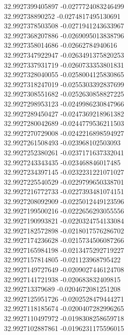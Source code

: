 {32.9927399405897	-0.0277724083246499\\
32.992738890252	-0.0274817495130691\\
32.9927378503508	-0.0271941243633967\\
32.9927368207886	-0.0269095013838796\\
32.9927358014686	-0.02662784940616\\
32.9927347922947	-0.0263491375820253\\
32.9927337931719	-0.0260733353801831\\
32.9927328040055	-0.0258004125830865\\
32.9927318247019	-0.0255303392837699\\
32.9927308551682	-0.0252630858827225\\
32.9927298953123	-0.0249986230847966\\
32.9927289450427	-0.0247369218961382\\
32.9927280042689	-0.0244779536211503\\
32.9927270729008	-0.0242216898594927\\
32.9927261508493	-0.023968102503093\\
32.9927252380261	-0.0237171637332041\\
32.9927243343435	-0.023468846017485\\
32.9927234397145	-0.0232231221071027\\
32.9927225540529	-0.0229799650338701\\
32.9927216772733	-0.0227393481074151\\
32.9927208092909	-0.0225012449123596\\
32.9927199500216	-0.0222656293055556\\
32.9927190993821	-0.0220324754133084\\
32.9927182572898	-0.0218017576286702\\
32.9927174236628	-0.0215734506087266\\
32.9927165984198	-0.0213475292719227\\
32.9927157814805	-0.021123968795422\\
32.9927149727649	-0.0209027446124708\\
32.9927141721938	-0.020683832409815\\
32.992713379689	-0.0204672081251208\\
32.9927125951726	-0.0202528479444271\\
32.9927118185674	-0.0200407282996265\\
32.9927110497972	-0.0198308258659718\\
32.9927102887861	-0.0196231175596015\\
}
